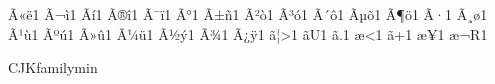 \documentclass{article}
\begin{document}
{        {^^c3^^ab}{{\"{e}}}1  %
        {^^c3^^ac}{{\`{i}}}1  %
        {^^c3^^ad}{{\'{i}}}1  %
        {^^c3^^ae}{{\^{i}}}1  %
        {^^c3^^af}{{\"{i}}}1  %
        {^^c3^^b0}{{\DH}}1  %
        {^^c3^^b1}{{\~{n}}}1  %
        {^^c3^^b2}{{\`{o}}}1  %
        {^^c3^^b3}{{\'{o}}}1  %
        {^^c3^^b4}{{\^{o}}}1  %
        {^^c3^^b5}{{\~{o}}}1  %
        {^^c3^^b6}{{\"{o}}}1  %
        {^^c3^^b7}{{\textdiv}}1  %
        {^^c3^^b8}{{\o}}1  %
        {^^c3^^b9}{{\`{u}}}1  %
        {^^c3^^ba}{{\'{u}}}1  %
        {^^c3^^bb}{{\^{u}}}1  %
        {^^c3^^bc}{{\"{u}}}1  %
        {^^c3^^bd}{{\'{y}}}1  %
        {^^c3^^be}{{\th}}1  %
        {^^c3^^bf}{{\"{y}}}1  %
        {^^e3^^81^^a6}{{>}}1  %
        {^^e3^^82^^8b}{{U}}1  %
        {^^e3^^80^^82}{{.}}1  %
        {^^e6^^84^^9b}{{<}}1  %
        {^^e3^^81^^97}{{+}}1  %
        {^^e6^^97^^a5}{{}}1  %
        {^^e6^^9c^^ac}{{R}}1  %
}
\lstset{language=$LANGUAGE}
\begin{CJK}{UTF8}{}
\newenvironment{Japanese}{CJKfamily{min}}{}
\begin{Japanese}

\end{Japanese}
\end{CJK}
\end{document}
